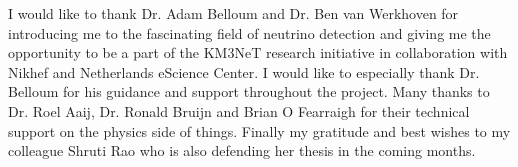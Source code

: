 

\begin{acknowledgements}      %
I would like to thank Dr. Adam Belloum and Dr. Ben van Werkhoven for
introducing me to the fascinating field of neutrino detection and
giving me the opportunity to be a part of the KM3NeT research
initiative in collaboration with Nikhef and Netherlands eScience
Center. I would like to especially thank Dr. Belloum for his guidance
and support throughout the project. Many thanks to Dr. Roel Aaij, Dr.
Ronald Bruijn and Brian O Fearraigh for their technical support on the
physics side of things. Finally my gratitude and best wishes to my
colleague Shruti Rao who is also defending her thesis in the coming
months.
\end{acknowledgements}



